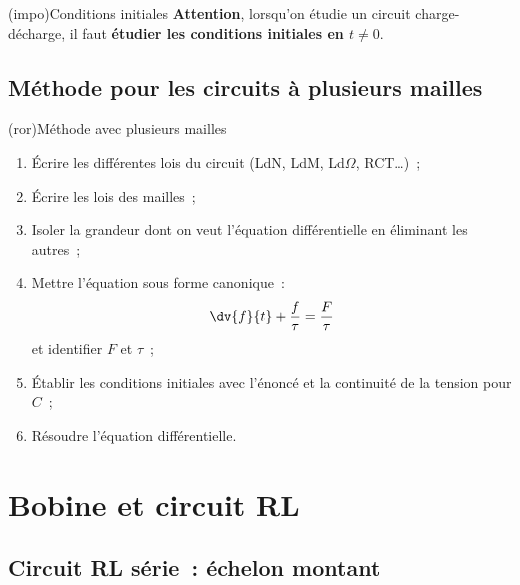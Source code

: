 \documentclass[../../main/main.tex]{subfiles}
\begin{document}
\begin{tcb*}(impo){Conditions initiales}
  \textbf{Attention}, lorsqu'on étudie un circuit charge-décharge, il faut
  \textbf{étudier les conditions initiales en $\boxed{t \neq 0}$}.
\end{tcb*}

\subsection{Méthode pour les circuits à plusieurs mailles}
\begin{tcb*}[breakable](ror){Méthode avec plusieurs mailles}
	\begin{enumerate}[label=\sqenumi]
		\item Écrire les différentes lois du circuit (LdN, LdM, Ld$\Omega$, RCT…)~;
		\item Écrire les lois des mailles~;
		\item Isoler la grandeur dont on veut l'équation différentielle en éliminant
		      les autres~;
		\item Mettre l'équation sous forme canonique~:
		      \[
			      \dv{f}{t} + \frac{f}{\tau} = \frac{F}{\tau}
		      \]
		      et identifier $F$ et $\tau$~;
		\item Établir les conditions initiales avec l'énoncé et la continuité de la
		      tension pour $C$~;
		\item Résoudre l'équation différentielle.
	\end{enumerate}
\end{tcb*}

\section{Bobine et circuit RL}
\subsection{Circuit RL série~: échelon montant}
\end{document}

